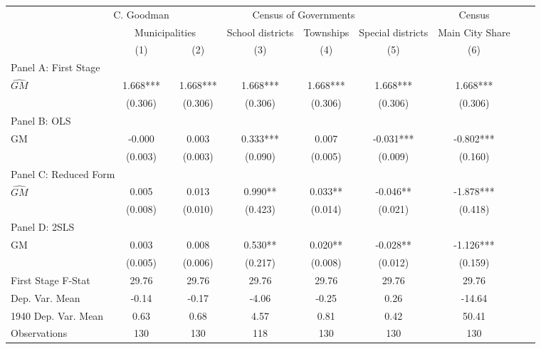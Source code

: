  \begin{tabular}{l*{8}{c}} \toprule
&\multicolumn{1}{c}{C. Goodman}&\multicolumn{4}{c}{Census of Governments}&\multicolumn{1}{c}{Census}\\\cmidrule(lr){2-2}\cmidrule(lr){3-6}\cmidrule(lr){7-7}
&\multicolumn{2}{c}{Municipalities}&\multicolumn{1}{c}{School districts}&\multicolumn{1}{c}{Townships}&\multicolumn{1}{c}{Special districts}&\multicolumn{1}{c}{Main City Share}\\\cmidrule(lr){2-3}\cmidrule(lr){4-6}\cmidrule(lr){7-7}
&\multicolumn{1}{c}{(1)}&\multicolumn{1}{c}{(2)}&\multicolumn{1}{c}{(3)}&\multicolumn{1}{c}{(4)}&\multicolumn{1}{c}{(5)}&\multicolumn{1}{c}{(6)}\\
\cmidrule(lr){1-7}
\multicolumn{6}{l}{Panel A: First Stage}\\
\cmidrule(lr){1-7}
$\widehat{GM}$  &    1.668***&    1.668***&    1.668***&    1.668***&    1.668***&    1.668***\\
                &  (0.306)   &  (0.306)   &  (0.306)   &  (0.306)   &  (0.306)   &  (0.306)   \\
\cmidrule(lr){1-7}
\multicolumn{6}{l}{Panel B: OLS}\\
\cmidrule(lr){1-7}
GM              &   -0.000   &    0.003   &    0.333***&    0.007   &   -0.031***&   -0.802***\\
                &  (0.003)   &  (0.003)   &  (0.090)   &  (0.005)   &  (0.009)   &  (0.160)   \\
\cmidrule(lr){1-7}
\multicolumn{6}{l}{Panel C: Reduced Form}\\
\cmidrule(lr){1-7}
$\widehat{GM}$  &    0.005   &    0.013   &    0.990** &    0.033** &   -0.046** &   -1.878***\\
                &  (0.008)   &  (0.010)   &  (0.423)   &  (0.014)   &  (0.021)   &  (0.418)   \\
\cmidrule(lr){1-7}
\multicolumn{6}{l}{Panel D: 2SLS}\\
\cmidrule(lr){1-7}
GM              &    0.003   &    0.008   &    0.530** &    0.020** &   -0.028** &   -1.126***\\
                &  (0.005)   &  (0.006)   &  (0.217)   &  (0.008)   &  (0.012)   &  (0.159)   \\
\midrule
First Stage F-Stat&    29.76   &    29.76   &    29.76   &    29.76   &    29.76   &    29.76   \\
Dep. Var. Mean  &    -0.14   &    -0.17   &    -4.06   &    -0.25   &     0.26   &   -14.64   \\
1940 Dep. Var. Mean&     0.63   &     0.68   &     4.57   &     0.81   &     0.42   &    50.41   \\
Observations    &      130   &      130   &      118   &      130   &      130   &      130   \\
 \bottomrule \end{tabular}
